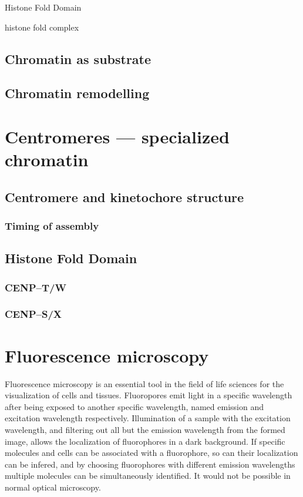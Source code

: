     Histone Fold Domain

    histone fold complex

  \subsection{Chromatin as substrate}

  \subsection{Chromatin remodelling}

\section{Centromeres --- specialized chromatin}
  \subsection{Centromere and kinetochore structure}
    \subsubsection{Timing of assembly}
  \subsection{Histone Fold Domain}
    \subsubsection{CENP--T/W}
    \subsubsection{CENP--S/X}

\section{Fluorescence microscopy}

  Fluorescence microscopy is an essential tool in the field of life
  sciences for the visualization of cells and tissues.
  Fluoropores emit light in a specific wavelength after
  being exposed to another specific wavelength, named
  emission and excitation wavelength respectively.
  Illumination of a sample with the excitation wavelength, and filtering
  out all but the emission wavelength from the formed image, allows
  the localization of fluorophores in a dark background.
  If specific molecules and cells can be associated with a fluorophore,
  so can their localization can be infered, and by choosing fluorophores
  with different emission wavelengths multiple molecules can be
  simultaneously identified.
  It would not be possible in normal optical microscopy.

